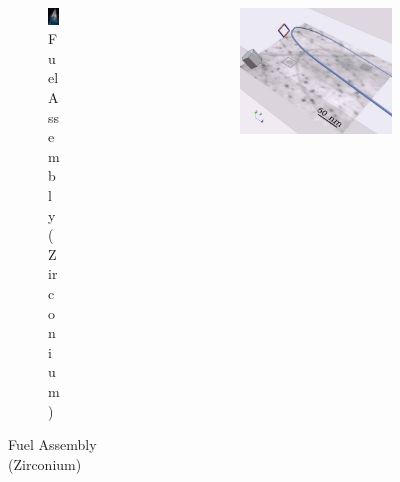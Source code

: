 \documentclass[aspectratio=1610,t,10pt]{beamer}
\newlength{\freeheight}
\begin{document}
\begin{frame}
\begin{columns}[c]
\begin{column}{.48\textwidth}
\begin{figure}
\begin{subfigure}[t]{0.58\textwidth}
	                \includegraphics[height=0.5\freeheight, keepaspectratio]{img/claddings}
	                \caption{Fuel Assembly (Zirconium)}
	            \end{subfigure}
	        \end{figure}
	    \end{column}
	    \begin{column}{.48\textwidth}
		    	\centering
		    \begin{figure}
		    	\begin{subfigure}[c]{0.48\textwidth}
		    		\centering
		    		\includegraphics[width=\linewidth, keepaspectratio]{img/dd-in-situ}

\end{subfigure}
\end{figure}
\end{column}
\end{columns}
\end{frame}
\end{document}
